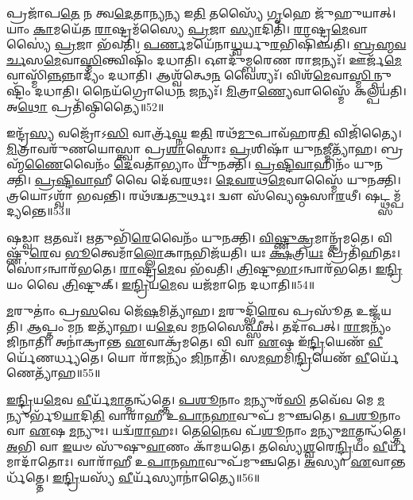 𑌪𑍍𑌰𑌜𑌾᳴𑌪\-\ul{𑌤𑍇} 𑌨 𑌤𑍍𑌵\-\ul{𑌦𑍇}\-𑌤𑌾\-\ul{𑌨𑍍𑌯}\-𑌨𑍍𑌯 𑌇\-\ul{𑌤𑌿} 𑌤𑌸𑍍𑌯𑍈᳴ \ul{𑌗𑍃}\-𑌹𑍇 𑌜𑍁᳴𑌹𑍁𑌯𑌾𑌤𑍍।
𑌯𑌾𑌂 \ul{𑌕𑌾}\-𑌮𑌯𑍇᳴𑌤 \ul{𑌰𑌾}\-𑌷𑍍𑌟𑍍𑌰𑌮᳴𑌸𑍍𑌯𑍈 \ul{𑌪𑍍𑌰}\-𑌜𑌾 \ul{𑌸𑍍𑌯𑌾}\-𑌦𑌿𑌤𑌿᳴।
\-\ul{𑌰𑌾}\-𑌷𑍍𑌟𑍍𑌰\-\ul{𑌮𑍇}\-𑌵𑌾𑌸𑍍𑌯𑍈॑ \ul{𑌪𑍍𑌰}\-𑌜𑌾 𑌭᳴𑌵𑌤𑌿।
\-\ul{𑌪}\-\-\ul{𑌰𑍍𑌣}\-𑌮𑌯𑍇᳴𑌨𑌾\-\ul{𑌧𑍍𑌵}\-𑌰𑍍𑌯𑍁\-\ul{𑌰}\-𑌭𑌿𑌷𑌿᳴𑌞𑍍𑌚𑌤𑌿।
\-\ul{𑌬𑍍𑌰}\-\-\ul{𑌹𑍍𑌮}\-\-\ul{𑌵}\-\-\ul{𑌰𑍍𑌚}\-𑌸\-\ul{𑌮𑍇}\-𑌵𑌾\-\-\ul{𑌸𑍍𑌮𑌿}\-𑌨𑍍𑌤𑍍𑌵𑌿𑌷𑌿𑌂᳴ 𑌦𑌧𑌾𑌤𑌿।
𑌔𑌦𑍁᳴𑌮𑍍𑌬𑌰𑍇𑌣 𑌰𑌾\-\ul{𑌜}\-𑌨𑍍𑌯𑌃᳴।
𑌊𑌰𑍍𑌜᳴\-\ul{𑌮𑍇}\-𑌵𑌾\-𑌸𑍍𑌮𑌿᳴\-\ul{𑌨𑍍𑌨}\-𑌨𑍍𑌨𑌾𑌦𑍍𑌯𑌂᳴ 𑌦𑌧𑌾𑌤𑌿।
𑌆𑌶𑍍𑌵᳴𑌤𑍍𑌥𑍇\-\ul{𑌨} 𑌵𑍈𑌶𑍍𑌯𑌃᳴।
𑌵𑌿𑌶᳴\-\ul{𑌮𑍇}\-𑌵𑌾\-\ul{𑌸𑍍𑌮𑌿}\-𑌨𑍍𑌪𑍁𑌷𑍍𑌟𑌿𑌂᳴ 𑌦𑌧𑌾𑌤𑌿।
𑌨𑍈𑌯᳴𑌗𑍍𑌰𑍋𑌧𑍇\-\ul{𑌨} 𑌜𑌨𑍍𑌯𑌃᳴।
\-\ul{𑌮𑌿}\-𑌤𑍍𑌰𑌾\-\ul{𑌣𑍍𑌯𑍇}\-𑌵𑌾𑌸𑍍𑌮𑍈᳴ 𑌕𑌲𑍍𑌪𑌯𑌤𑌿।
𑌅\-\ul{𑌥𑍋} 𑌪𑍍𑌰𑌤𑌿᳴\-𑌷𑍍𑌠𑌿𑌤𑍍𑌯𑍈॥52॥\anuvakamend[\-\ul{𑌭}\-\-\ul{𑌵}\-\-\ul{𑌤𑍍𑌯𑌾}\-\-\ul{𑌹𑍁𑌃} 𑌪𑍁𑌰𑍁᳴\-\ul{𑌷} 𑌓\-\ul{𑌜}\-𑌸𑍇𑌤𑍍𑌯𑌾᳴𑌹 \ul{𑌨𑌿}\-𑌰𑌵᳴𑌦𑌯𑌤𑍇 𑌯𑌜\-\ul{𑌤𑍇} 𑌜\-\ul{𑌨𑍍𑌯𑍋} 𑌦𑍍𑌵𑍇 𑌚᳴]

𑌇𑌨𑍍𑌦𑍍𑌰᳴\-\ul{𑌸𑍍𑌯} 𑌵𑌜𑍍𑌰𑍋᳴𑌽\-\ul{𑌸𑌿} 𑌵𑌾𑌰𑍍𑌤𑍍𑌰᳴\-\ul{𑌘𑍍𑌨} 𑌇\-\ul{𑌤𑌿} 𑌰𑌥᳴\-\ul{𑌮𑍁}\-𑌪𑌾𑌵᳴𑌹𑌰\-\ul{𑌤𑌿} 𑌵𑌿𑌜𑌿᳴𑌤𑍍𑌯𑍈।
\-\ul{𑌮𑌿}\-𑌤𑍍𑌰𑌾𑌵𑌰𑍁᳴𑌣𑌯𑍋𑌸𑍍𑌤𑍍𑌵𑌾 𑌪𑍍𑌰\-\ul{𑌶𑌾}\-𑌸𑍍𑌤𑍍𑌰𑍋𑌃 \ul{𑌪𑍍𑌰}\-𑌶𑌿𑌷𑌾᳴ 𑌯𑍁\-\ul{𑌨}\-𑌜𑍍𑌮𑍀𑌤𑍍𑌯𑌾᳴𑌹।
𑌬𑍍𑌰𑌹𑍍𑌮᳴\-\ul{𑌣𑍈}\-𑌵𑍈𑌨𑌂᳴ \ul{𑌦𑍇}\-𑌵𑌤𑌾॑𑌭𑍍𑌯𑌾𑌂 𑌯𑍁𑌨𑌕𑍍𑌤𑌿।
\-\ul{𑌪𑍍𑌰}\-\-\ul{𑌷𑍍𑌟𑌿}\-\-\ul{𑌵𑌾}\-𑌹𑌿𑌨𑌂᳴ 𑌯𑍁𑌨𑌕𑍍𑌤𑌿।
\-\ul{𑌪𑍍𑌰}\-\-\ul{𑌷𑍍𑌟𑌿}\-\-\ul{𑌵𑌾}\-𑌹𑍀 𑌵𑍈 𑌦𑍇᳴𑌵\-\ul{𑌰}\-𑌥𑌃।
\-\ul{𑌦𑍇}\-\-\ul{𑌵}\-\-\ul{𑌰}\-𑌥\-\ul{𑌮𑍇}\-𑌵𑌾𑌸𑍍𑌮𑍈᳴ 𑌯𑍁𑌨𑌕𑍍𑌤𑌿।
𑌤𑍍𑌰𑌯𑍋\-𑌽𑌶𑍍𑌵𑌾᳴ 𑌭𑌵𑌨𑍍𑌤𑌿।
𑌰𑌥᳴𑌶𑍍𑌚\-\ul{𑌤𑍁}\-𑌰𑍍𑌥𑌃।
𑌦𑍍𑌵𑍗 𑌸᳴𑌵𑍍𑌯𑍇𑌷𑍍𑌠𑌸𑌾\-\ul{𑌰}\-𑌥𑍀।
𑌷𑌟𑍍𑌥𑍍𑌸𑌮𑍍𑌪᳴𑌦𑍍𑌯𑌨𑍍𑌤𑍇॥53॥

𑌷𑌡𑍍𑌵𑌾 \ul{𑌋}\-𑌤𑌵𑌃᳴।
\-\ul{𑌋}\-𑌤𑍁𑌭𑌿᳴\-\ul{𑌰𑍇}\-𑌵𑍈𑌨𑌂᳴ 𑌯𑍁𑌨𑌕𑍍𑌤𑌿।
\-\ul{𑌵𑌿}\-\-\ul{𑌷𑍍𑌣𑍁}\-\-\ul{𑌕𑍍𑌰}\-𑌮𑌾𑌨𑍍𑌕𑍍𑌰᳴𑌮𑌤𑍇।
𑌵𑌿𑌷𑍍𑌣𑍁᳴\-\ul{𑌰𑍇}\-𑌵 \ul{𑌭𑍂}\-𑌤𑍍𑌵𑍇𑌮𑌾𑌁\-\ul{𑌲𑍍𑌲𑍋}\-𑌕𑌾\-\ul{𑌨}\-𑌭𑌿𑌜᳴𑌯𑌤𑌿।
𑌯𑌃 \ul{𑌕𑍍𑌷}\-𑌤𑍍𑌰𑌿\-\ul{𑌯𑌃} 𑌪𑍍𑌰𑌤𑌿᳴\-𑌹𑌿𑌤𑌃।
𑌸𑍋॑𑌽𑌨𑍍𑌵𑌾𑌰᳴𑌭𑌤𑍇।
\-\ul{𑌰𑌾}\-𑌷𑍍𑌟𑍍𑌰\-\ul{𑌮𑍇}\-𑌵 𑌭᳴𑌵𑌤𑌿।
\-\ul{𑌤𑍍𑌰𑌿}\-𑌷𑍍𑌟𑍁\-\ul{𑌭𑌾}\-\-𑌽𑌨𑍍𑌵𑌾𑌰᳴𑌭𑌤𑍇।
\-\ul{𑌇}\-\-\ul{𑌨𑍍𑌦𑍍𑌰𑌿}\-𑌯𑌂 𑌵𑍈 \ul{𑌤𑍍𑌰𑌿}\-𑌷𑍍𑌟𑍁𑌕𑍍।
\-\ul{𑌇}\-\-\ul{𑌨𑍍𑌦𑍍𑌰𑌿}\-𑌯\-\ul{𑌮𑍇}\-𑌵 𑌯𑌜᳴𑌮𑌾𑌨𑍇 𑌦𑌧𑌾𑌤𑌿॥54॥

\-\ul{𑌮}\-𑌰𑍁𑌤𑌾𑌂॑ 𑌪𑍍𑌰\-\ul{𑌸}\-𑌵𑍇 𑌜𑍇᳴\-\ul{𑌷}\-𑌮𑌿𑌤𑍍𑌯𑌾᳴𑌹।
\-\ul{𑌮}\-𑌰𑍁𑌦𑍍𑌭𑌿᳴\-\ul{𑌰𑍇}\-𑌵 𑌪𑍍𑌰𑌸𑍂᳴\-\ul{𑌤} 𑌉𑌜𑍍𑌜᳴𑌯𑌤𑌿।
\-\ul{𑌆}\-𑌪𑍍𑌤𑌂 𑌮\-\ul{𑌨} 𑌇𑌤𑍍𑌯𑌾᳴𑌹।
𑌯\-\ul{𑌦𑍇}\-𑌵 𑌮\-\ul{𑌨}\-𑌸𑍈𑌫𑍍𑌸𑍀॑𑌤𑍍।
𑌤𑌦𑌾᳴𑌪𑌤𑍍।
\-\ul{𑌰𑌾}\-\-\ul{𑌜}\-𑌨𑍍𑌯𑌂᳴ 𑌜𑌿𑌨𑌾𑌤𑌿।
𑌅𑌨𑌾॑𑌕𑍍𑌰𑌾𑌨𑍍𑌤 \ul{𑌏}\-𑌵𑌾𑌕𑍍𑌰᳴𑌮𑌤𑍇।
𑌵𑌿 𑌵𑌾 \ul{𑌏}\-𑌷 𑌇᳴\-\ul{𑌨𑍍𑌦𑍍𑌰𑌿}\-𑌯𑍇𑌣᳴ \ul{𑌵𑍀}\-𑌰𑍍𑌯𑍇᳴𑌣𑌰𑍍𑌧𑍍𑌯𑌤𑍇।
𑌯𑍋 𑌰𑌾᳴\-\ul{𑌜}\-𑌨𑍍𑌯𑌂᳴ \ul{𑌜𑌿}\-𑌨𑌾𑌤𑌿᳴।
𑌸\-\ul{𑌮}\-𑌹𑌮𑌿᳴\-\ul{𑌨𑍍𑌦𑍍𑌰𑌿}\-𑌯𑍇𑌣᳴ \ul{𑌵𑍀}\-𑌰𑍍𑌯𑍇᳴𑌣𑍇𑌤𑍍𑌯𑌾᳴𑌹॥55॥

\-\ul{𑌇}\-\-\ul{𑌨𑍍𑌦𑍍𑌰𑌿}\-𑌯\-\ul{𑌮𑍇}\-𑌵 \ul{𑌵𑍀}\-𑌰𑍍𑌯᳴\-\ul{𑌮𑌾}\-𑌤𑍍𑌮𑌨𑍍𑌧᳴𑌤𑍍𑌤𑍇।
\-\ul{𑌪}\-\-\ul{𑌶𑍂}\-𑌨𑌾𑌂 \ul{𑌮}\-𑌨𑍍𑌯𑍁𑌰᳴\-\ul{𑌸𑌿} 𑌤𑌵𑍇᳴𑌵 𑌮𑍇 \ul{𑌮}\-𑌨𑍍𑌯𑍁𑌰𑍍𑌭𑍂᳴\-\ul{𑌯𑌾}\-𑌦𑌿\-\ul{𑌤𑌿} 𑌵𑌾𑌰𑌾᳴𑌹𑍀 𑌉\-\ul{𑌪𑌾}\-𑌨\-\ul{𑌹𑌾}\-𑌵𑍁𑌪᳴ 𑌮𑍁𑌞𑍍𑌚𑌤𑍇।
\-\ul{𑌪}\-\-\ul{𑌶𑍂}\-𑌨𑌾𑌂 𑌵𑌾 \ul{𑌏}\-𑌷 \ul{𑌮}\-𑌨𑍍𑌯𑍁𑌃।
𑌯𑌦𑍍𑌵᳴\-\ul{𑌰𑌾}\-𑌹𑌃।
𑌤𑍇\-\ul{𑌨𑍈}\-𑌵 𑌪᳴\-\ul{𑌶𑍂}\-𑌨𑌾𑌂 \ul{𑌮}\-𑌨𑍍𑌯𑍁\-\ul{𑌮𑌾}\-𑌤𑍍𑌮𑌨𑍍𑌧᳴𑌤𑍍𑌤𑍇।
\-\ul{𑌅}\-𑌭𑌿 𑌵𑌾 \ul{𑌇}\-𑌯𑍞 𑌸𑍁᳴𑌷𑍁\-\ul{𑌵𑌾}\-𑌣𑌂 𑌕𑌾᳴𑌮𑌯𑌤𑍇।
𑌤𑌸𑍍𑌯𑍇॑\-\ul{𑌶𑍍𑌵}\-𑌰𑍇\-\ul{𑌨𑍍𑌦𑍍𑌰𑌿}\-𑌯𑌂 \ul{𑌵𑍀}\-𑌰𑍍𑌯᳴𑌮𑌾𑌦𑌾᳴𑌤𑍋𑌃।
𑌵𑌾𑌰𑌾᳴𑌹𑍀 𑌉\-\ul{𑌪𑌾}\-𑌨\-\ul{𑌹𑌾}\-𑌵𑍁𑌪᳴𑌮𑍁𑌞𑍍𑌚𑌤𑍇।
\-\ul{𑌅}\-𑌸𑍍𑌯𑌾 \ul{𑌏}\-𑌵𑌾𑌨𑍍𑌤𑌰𑍍𑌧᳴𑌤𑍍𑌤𑍇।
\-\ul{𑌇}\-\-\ul{𑌨𑍍𑌦𑍍𑌰𑌿}\-𑌯𑌸𑍍𑌯᳴ \ul{𑌵𑍀}\-𑌰𑍍𑌯᳴𑌸𑍍𑌯𑌾𑌨𑌾॑𑌤𑍍𑌯𑍈॥56॥

